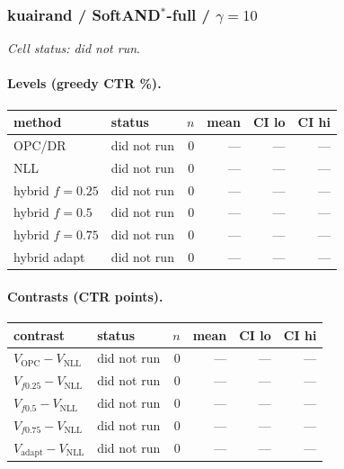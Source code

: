 \documentclass[10pt,a4paper]{article}
\begin{document}
\subsubsection{kuairand / SoftAND$^*$-full / $\gamma=10$}
\emph{Cell status: did not run}.
\paragraph{Levels (greedy CTR \%).}
{\centering\small\begin{tabular}{llrrrr}
\toprule method & status & $n$ & mean & CI lo & CI hi \\
\midrule
OPC/DR & did not run & 0 & --- & --- & --- \\
NLL & did not run & 0 & --- & --- & --- \\
hybrid $f{=}0.25$ & did not run & 0 & --- & --- & --- \\
hybrid $f{=}0.5$ & did not run & 0 & --- & --- & --- \\
hybrid $f{=}0.75$ & did not run & 0 & --- & --- & --- \\
hybrid adapt & did not run & 0 & --- & --- & --- \\
\bottomrule\end{tabular}\par}
\paragraph{Contrasts (CTR points).}
{\centering\small\begin{tabular}{llrrrr}
\toprule contrast & status & $n$ & mean & CI lo & CI hi \\
\midrule
$V_{\mathrm{OPC}}-V_{\mathrm{NLL}}$ & did not run & 0 & --- & --- & --- \\
$V_{f0.25}-V_{\mathrm{NLL}}$ & did not run & 0 & --- & --- & --- \\
$V_{f0.5}-V_{\mathrm{NLL}}$ & did not run & 0 & --- & --- & --- \\
$V_{f0.75}-V_{\mathrm{NLL}}$ & did not run & 0 & --- & --- & --- \\
$V_{\mathrm{adapt}}-V_{\mathrm{NLL}}$ & did not run & 0 & --- & --- & --- \\
\bottomrule\end{tabular}\par}
\end{document}
